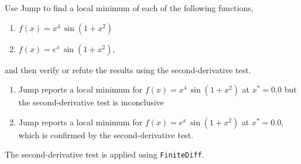 \begin{example} Use Jump to find a local minimum of each of the following functions,
\begin{enumerate}
\renewcommand{\labelenumi}{(\alph{enumi})}
\setlength{\itemsep}{.2cm}
    \item $f(x) = x^4 \, \sin(1 + x^2)$
    \item $f(x) = e^x \, \sin(1 + x^2)$,
\end{enumerate}
 and then verify or refute the results using the second-derivative test.   
\end{example}
\solutions 

\begin{enumerate}
\renewcommand{\labelenumi}{(\alph{enumi})}
\setlength{\itemsep}{.2cm}
    \item Jump reports a local minimum for $f(x) = x^4 \, \sin(1 + x^2)$ at $x^\ast = 0.0$ but the second-derivative test is inconclusive
    \item Jump reports a local minimum for $f(x) = e^x \, \sin(1 + x^2)$ at $x^\ast = 0.0$, which is confirmed by the second-derivative test.
\end{enumerate}

\bigskip
The second-derivative test is applied using \texttt{FiniteDiff}.\\

